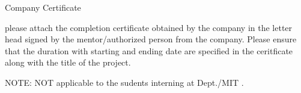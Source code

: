 

\begin{center} {\large Company Certificate \par}
\end{center}

please attach the completion certificate obtained by the company in the letter head signed by the mentor/authorized person from the company. Please ensure that the duration with starting and ending date are specified in the ceritficate along with the title of the project.

NOTE: NOT applicable to the sudents interning at Dept./MIT .
